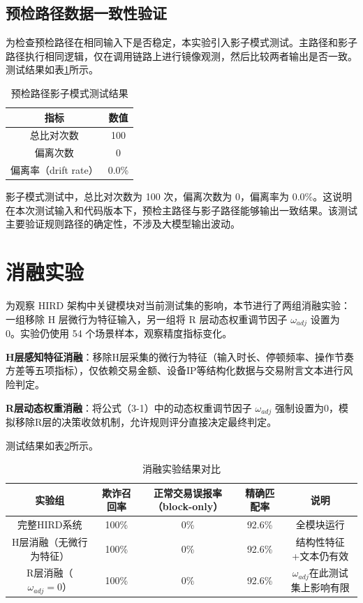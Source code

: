 \documentclass{xduugthesis}
\begin{document}
\subsection{预检路径数据一致性验证}

为检查预检路径在相同输入下是否稳定，本实验引入影子模式测试。主路径和影子路径执行相同逻辑，仅在调用链路上进行镜像观测，然后比较两者输出是否一致。测试结果如表\ref{tab:shadow-mode-test}所示。

\begin{table}[H]
    \centering
    \caption{预检路径影子模式测试结果}
    \label{tab:shadow-mode-test}
    \begin{tabular}{|c|c|}
        \hline
        指标 & 数值 \\
        \hline
        总比对次数 & 100 \\
        \hline
        偏离次数 & 0 \\
        \hline
        偏离率（drift rate） & 0.0\% \\
        \hline
    \end{tabular}
\end{table}

影子模式测试中，总比对次数为 100 次，偏离次数为 0，偏离率为 0.0\%。这说明在本次测试输入和代码版本下，预检主路径与影子路径能够输出一致结果。该测试主要验证规则路径的确定性，不涉及大模型输出波动。

\section{消融实验}

为观察 HIRD 架构中关键模块对当前测试集的影响，本节进行了两组消融实验：一组移除 H 层微行为特征输入，另一组将 R 层动态权重调节因子 $\omega_{adj}$ 设置为 0。实验仍使用 54 个场景样本，观察精度指标变化。

\textbf{H层感知特征消融}：移除H层采集的微行为特征（输入时长、停顿频率、操作节奏方差等五项指标），仅依赖交易金额、设备IP等结构化数据与交易附言文本进行风险判定。

\textbf{R层动态权重消融}：将公式（3-1）中的动态权重调节因子 $\omega_{adj}$ 强制设置为0，模拟移除R层的决策收敛机制，允许规则评分直接决定最终判定。

测试结果如表\ref{tab:ablation-study}所示。

\begin{table}[H]
    \centering
    \caption{消融实验结果对比}
    \label{tab:ablation-study}
    \begin{tabular}{|c|c|c|c|c|}
        \hline
        实验组 & 欺诈召回率 & 正常交易误报率（block-only） & 精确匹配率 & 说明 \\
        \hline
        完整HIRD系统 & 100\% & 0\% & 92.6\% & 全模块运行 \\
        \hline
        H层消融（无微行为特征） & 100\% & 0\% & 92.6\% & 结构性特征+文本仍有效 \\
        \hline
        R层消融（$\omega_{adj}=0$） & 100\% & 0\% & 92.6\% & $\omega_{adj}$在此测试集上影响有限 \\
        \hline
    \end{tabular}
\end{table}
\end{document}
